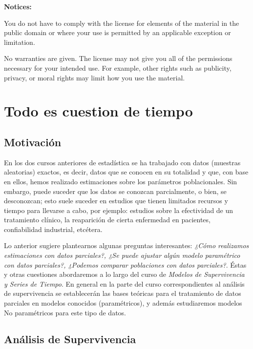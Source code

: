 \documentclass[
  a4paper,
  oneside,
  openany]{book}
\begin{document}
\textbf{Notices:}

You do not have to comply with the license for elements of the
material in the public domain or where your use is permitted by an
applicable exception or limitation.

No warranties are given. The license may not give you all of the
permissions necessary for your intended use. For example, other rights
such as publicity, privacy, or moral rights may limit how you use the
material.

\hypertarget{part-todo-es-cuestion-de-tiempo}{%
\part{Todo es cuestion de tiempo}\label{part-todo-es-cuestion-de-tiempo}}

\hypertarget{motivaciuxf3n}{%
\chapter*{Motivación}\label{motivaciuxf3n}}


En los dos cursos anteriores de estadística se ha trabajado con datos (muestras aleatorias) exactos, es decir, datos que se conocen en su totalidad y que, con base en ellos, hemos realizado estimaciones sobre los parámetros poblacionales. Sin embargo, puede suceder que los datos se conozcan parcialmente, o bien, se desconozcan; esto suele suceder en estudios que tienen limitados recursos y tiempo para llevarse a cabo, por ejemplo: estudios sobre la efectividad de un tratamiento clínico, la reaparición de cierta enfermedad en pacientes, confiabilidad industrial, etcétera.

Lo anterior sugiere plantearnos algunas preguntas interesantes: \emph{¿Cómo realizamos estimaciones con datos parciales?, ¿Se puede ajustar algún modelo paramétrico con datos parciales?, ¿Podemos comparar poblaciones con datos parciales?}. Éstas y otras cuestiones abordaremos a lo largo del curso de \emph{Modelos de Supervivencia y Series de Tiempo}. En general en la parte del curso correspondientes al análisis de supervivencia se establecerán las bases teóricas para el tratamiento de datos parciales en modelos conocidos (paramétricos), y además estudiaremos modelos No paramétricos para este tipo de datos.

\hypertarget{anuxe1lisis-de-supervivencia}{%
\chapter*{Análisis de Supervivencia}\label{anuxe1lisis-de-supervivencia}}
\end{document}
